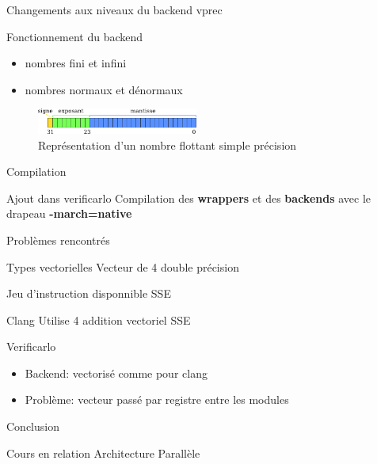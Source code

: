 \documentclass{beamer}
\begin{document}
\begin{frame}{Changements aux niveaux du backend vprec}

  \begin{block}{Fonctionnement du backend}
    \begin{itemize}
    \item nombres fini et infini
    \item nombres normaux et dénormaux
    \end{itemize}
  \end{block}

  \begin{figure}
    \centering
    \includegraphics[width=200px]{../ressources/IEEE754_simple_precision.png}
    \caption{\label{fig:ieee_simple_precision}Représentation d'un nombre flottant simple précision}
  \end{figure}

\end{frame}

\begin{frame}{Compilation}

  \begin{block}{Ajout dans verificarlo}
    Compilation des \textbf{wrappers} et des \textbf{backends} avec le drapeau
    \textbf{-march=native}
  \end{block}

\end{frame}

\begin{frame}{Problèmes rencontrés}

  \begin{block}{Types vectorielles}
    Vecteur de 4 double précision
  \end{block}

  \begin{block}{Jeu d'instruction disponnible}
    SSE
  \end{block}

  \begin{block}{Clang}
    Utilise 4 addition vectoriel SSE
  \end{block}

  \begin{block}{Verificarlo}
    \begin{itemize}
    \item Backend: vectorisé comme pour clang
    \item Problème: vecteur passé par registre entre les modules
    \end{itemize}
  \end{block}

\end{frame}

\begin{frame}{Conclusion}

  \begin{block}{Cours en relation}
    Architecture Parallèle
  \end{block}

\end{frame}
\end{document}

